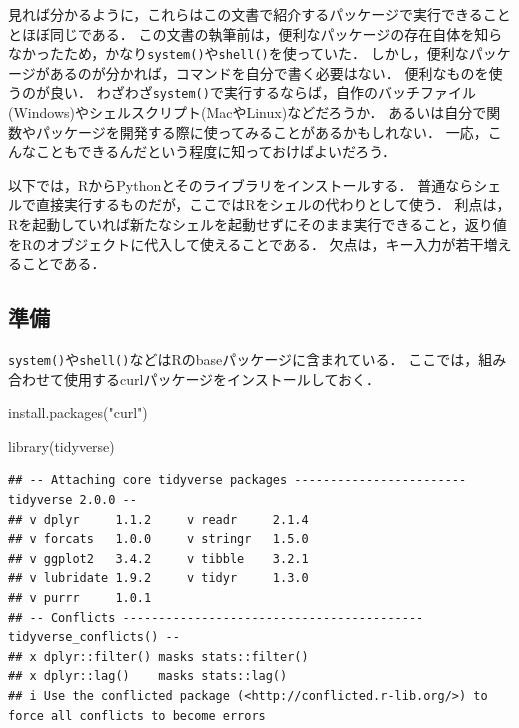 \documentclass[
]{article}
\newenvironment{Shaded}{\begin{snugshade}}{\end{snugshade}}
\newcommand{\FunctionTok}[1]{\textcolor[rgb]{0.00,0.00,0.00}{#1}}
\newcommand{\NormalTok}[1]{#1}
\newcommand{\StringTok}[1]{\textcolor[rgb]{0.31,0.60,0.02}{#1}}
\begin{document}
見れば分かるように，これらはこの文書で紹介するパッケージで実行できることとほぼ同じである．
この文書の執筆前は，便利なパッケージの存在自体を知らなかったため，かなり\texttt{system()}や\texttt{shell()}を使っていた．
しかし，便利なパッケージがあるのが分かれば，コマンドを自分で書く必要はない．
便利なものを使うのが良い．
わざわざ\texttt{system()}で実行するならば，自作のバッチファイル(Windows)やシェルスクリプト(MacやLinux)などだろうか．
あるいは自分で関数やパッケージを開発する際に使ってみることがあるかもしれない．
一応，こんなこともできるんだという程度に知っておけばよいだろう．

以下では，RからPythonとそのライブラリをインストールする．
普通ならシェルで直接実行するものだが，ここではRをシェルの代わりとして使う．
利点は，Rを起動していれば新たなシェルを起動せずにそのまま実行できること，返り値をRのオブジェクトに代入して使えることである．
欠点は，キー入力が若干増えることである．

\hypertarget{ux6e96ux5099-4}{%
\subsection{準備}\label{ux6e96ux5099-4}}

\texttt{system()}や\texttt{shell()}などはRのbaseパッケージに含まれている．
ここでは，組み合わせて使用するcurlパッケージをインストールしておく．

\begin{Shaded}
\begin{Highlighting}[]
\FunctionTok{install.packages}\NormalTok{(}\StringTok{"curl"}\NormalTok{)}
\end{Highlighting}
\end{Shaded}

\begin{Shaded}
\begin{Highlighting}[]
\FunctionTok{library}\NormalTok{(tidyverse)}
\end{Highlighting}
\end{Shaded}

\begin{verbatim}
## -- Attaching core tidyverse packages ------------------------ tidyverse 2.0.0 --
## v dplyr     1.1.2     v readr     2.1.4
## v forcats   1.0.0     v stringr   1.5.0
## v ggplot2   3.4.2     v tibble    3.2.1
## v lubridate 1.9.2     v tidyr     1.3.0
## v purrr     1.0.1     
## -- Conflicts ------------------------------------------ tidyverse_conflicts() --
## x dplyr::filter() masks stats::filter()
## x dplyr::lag()    masks stats::lag()
## i Use the conflicted package (<http://conflicted.r-lib.org/>) to force all conflicts to become errors
\end{verbatim}
\end{document}
